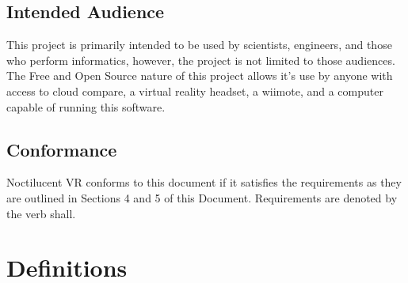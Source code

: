\documentclass{article}
\begin{document}
\subsection{Intended Audience}

This project is primarily intended to be used by scientists, engineers, and those who perform informatics, however, the project is not limited to those audiences.
The Free and Open Source nature of this project allows it's use by anyone with access to cloud compare, a virtual reality headset, a wiimote, and a computer capable of running this software.

\subsection{Conformance}

Noctilucent VR conforms to this document if it satisfies the requirements as they are outlined in Sections 4 and 5 of this Document. Requirements are denoted by the verb shall.

\section{Definitions}
\end{document}

